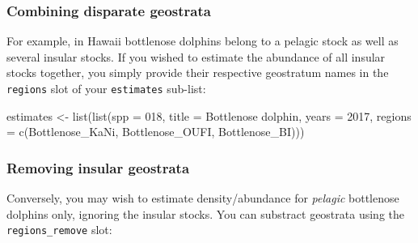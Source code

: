 \documentclass[
]{book}
\newenvironment{Shaded}{\begin{snugshade}}{\end{snugshade}}
\newcommand{\AttributeTok}[1]{\textcolor[rgb]{0.77,0.63,0.00}{#1}}
\newcommand{\DecValTok}[1]{\textcolor[rgb]{0.00,0.00,0.81}{#1}}
\newcommand{\FunctionTok}[1]{\textcolor[rgb]{0.00,0.00,0.00}{#1}}
\newcommand{\NormalTok}[1]{#1}
\newcommand{\OtherTok}[1]{\textcolor[rgb]{0.56,0.35,0.01}{#1}}
\newcommand{\StringTok}[1]{\textcolor[rgb]{0.31,0.60,0.02}{#1}}
\begin{document}
\hypertarget{combining-disparate-geostrata}{%
\subsubsection*{Combining disparate geostrata}\label{combining-disparate-geostrata}}

For example, in Hawaii bottlenose dolphins belong to a pelagic stock as well as several insular stocks. If you wished to estimate the abundance of all insular stocks together, you simply provide their respective geostratum names in the \texttt{regions} slot of your \texttt{estimates} sub-list:

\begin{Shaded}
\begin{Highlighting}[]
\NormalTok{estimates }\OtherTok{\textless{}{-}} \FunctionTok{list}\NormalTok{(}\FunctionTok{list}\NormalTok{(}\AttributeTok{spp =} \StringTok{\textquotesingle{}018\textquotesingle{}}\NormalTok{,}
                       \AttributeTok{title =} \StringTok{\textquotesingle{}Bottlenose dolphin\textquotesingle{}}\NormalTok{,}
                       \AttributeTok{years =} \DecValTok{2017}\NormalTok{,}
                       \AttributeTok{regions =} \FunctionTok{c}\NormalTok{(}\StringTok{\textquotesingle{}Bottlenose\_KaNi\textquotesingle{}}\NormalTok{,}
                                   \StringTok{\textquotesingle{}Bottlenose\_OUFI\textquotesingle{}}\NormalTok{,}
                                   \StringTok{\textquotesingle{}Bottlenose\_BI\textquotesingle{}}\NormalTok{)))}
\end{Highlighting}
\end{Shaded}

\hypertarget{removing-insular-geostrata}{%
\subsubsection*{Removing insular geostrata}\label{removing-insular-geostrata}}

Conversely, you may wish to estimate density/abundance for \emph{pelagic} bottlenose dolphins only, ignoring the insular stocks. You can substract geostrata using the \texttt{regions\_remove} slot:
\end{document}
